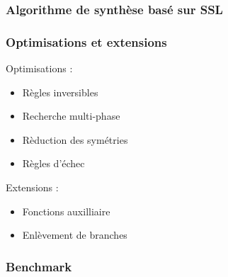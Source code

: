 \documentclass{beamer}
\begin{document}
\begin{frame}[fragile]
	\frametitle{Algorithme de synth\`ese bas\'e sur SSL}
\end{frame}
\begin{frame}[fragile]
	\frametitle{Optimisations et extensions}
	Optimisations :
	\begin{itemize}
		\item R\`egles inversibles
		\pause
		\item Recherche multi-phase
		\pause
		\item R\`eduction des sym\'etries
		\pause
		\item R\`egles d'\'echec 
	\end{itemize}
	\pause
	Extensions :
	\begin{itemize}
	\item Fonctions auxilliaire
	\pause
	\item Enl\`evement de branches	
	\end{itemize}
\end{frame}
\begin{frame}
	\frametitle{Benchmark}
\end{frame}
\end{document}
